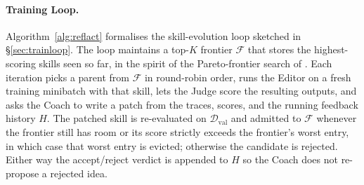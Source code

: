 \documentclass[11pt]{article}
\begin{document}
\paragraph{Training Loop.}
Algorithm~\ref{alg:reflact} formalises the skill-evolution
loop sketched in \S\ref{sec:trainloop}.  The loop maintains
a top-$K$ frontier $\mathcal{F}$ that stores the
highest-scoring skills seen so far, in the spirit of the
Pareto-frontier search of \citet{alzubi2026evoskill}.  Each
iteration picks a parent from $\mathcal{F}$ in round-robin
order, runs the Editor on a fresh training minibatch with
that skill, lets the Judge score the resulting outputs, and
asks the Coach to write a patch from the traces, scores, and
the running feedback history $H$.  The patched skill is
re-evaluated on $\mathcal{D}_{\mathrm{val}}$ and admitted to
$\mathcal{F}$ whenever the frontier still has room or its
score strictly exceeds the frontier's worst entry, in which
case that worst entry is evicted; otherwise the candidate is
rejected.  Either way the accept/reject verdict is appended
to $H$ so the Coach does not re-propose a rejected idea.
\end{document}

